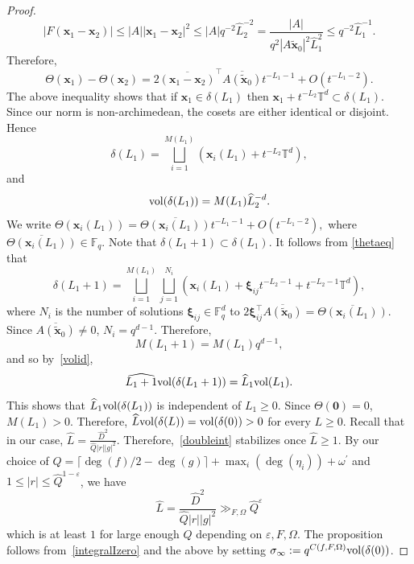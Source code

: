 \documentclass[10pt]{amsart}
\theoremstyle{plain}
\theoremstyle{plain}
\renewcommand{\vec}[1]{\mathbf{#1}}
\theoremstyle{remark}
\theoremstyle{definition}
\renewcommand{\hat}{\widehat}
\newcommand{\hQ}{\widehat{Q}}
\newcommand{\TT}{\mathbb{T}}
\newcommand{\vol}{\textup{vol}}
\begin{document}
\begin{proof}
\[
|F(\vec{x}_1-\vec{x}_2)| \leq |A| |\vec{x}_1-\vec{x}_2|^2 \leq |A| q^{-2}\hat{L}_2^{-2} = \frac{|A|}{q^2 |A\tilde{\vec{x}}_0|^2 \hat{L}_1^2} \leq q^{-2}\hat{L}_1^{-1}.
\]Therefore,
\begin{equation}\label{thetaeq}
\Theta(\vec{x}_1)-\Theta(\vec{x}_2)= 2 \overline{(\vec{x}_1-\vec{x}_2)}^{\intercal}\overline{A(\tilde{\vec{x}}_0)} t^{-L_1-1} +O(t^{-L_1-2}).
\end{equation}
The above inequality shows that if $\vec{x}_1\in \delta(L_1)$ then $\vec{x}_1+t^{-L_2}\TT^d \subset \delta(L_1).$ Since our norm is non-archimedean, the cosets are either identical or disjoint. Hence 
  \[\delta({L_1})=\bigsqcup_{i=1}^{M(L_1)} (\vec{x}_i(L_1)+t^{-L_2}\TT^d), \]
and 
\begin{equation}\label{volid}
\vol (\delta(L_1))= M(L_1)\hat{L}_2^{-d}.
\end{equation}
We write $\Theta(\vec{x}_i(L_1))=\overline{\Theta(\vec{x}_i(L_1))}t^{-L_1-1}+O(t^{-L_1-2}),$ where $\overline{\Theta(\vec{x}_i(L_1))} \in \mathbb{F}_q.$ Note that $\delta(L_1+1)\subset \delta(L_1).$
It follows from \eqref{thetaeq} that
\[
\delta(L_1+1)=\bigsqcup_{i=1}^{M(L_1)} \bigsqcup_{j=1}^{N_i}  (\vec{x}_i(L_1) +\boldsymbol{\xi}_{ij}t^{-L_2-1}+t^{-L_2-1}\TT^d), 
\]
where $N_i$ is the number of solutions $\boldsymbol{\xi}_{ij}\in \mathbb{F}_q^d$  to $2\boldsymbol{\xi}_{ij}^{\intercal}\overline{A(\tilde{\vec{x}}_0)}=\overline{\Theta(\vec{x}_i(L_1))}.$ Since $\overline{A(\tilde{\vec{x}}_0)}\neq 0$, $N_i=q^{d-1}.$
Therefore,
\[
M(L_1+1)=M(L_1)q^{d-1},
\]
and so by~\eqref{volid},
\[
\hat{L_1+1}\vol(\delta({L_1+1}))=\hat{L}_1\vol(L_1).
\]
This shows that $\hat{L}_1\vol(\delta(L_1))$ is independent of $L_1\geq 0$. Since $\Theta(\vec{0})=0$, $M(L_1)>0$. Therefore, $\hat{L}\vol(\delta(L))=\vol(\delta(0))>0$ for every $L\geq 0$. Recall that in our case, $\hat{L}=\frac{\hat{D}^2}{\hQ|r||g|^2}$. Therefore,~\eqref{doubleint} stabilizes once $\hat{L}\geq 1$. By our choice of $Q=\lceil{\deg(f)/2}-\deg(g)\rceil +\max_{i}(\deg(\eta_i))+\omega^{\prime}$ and $1\leq |r|\leq\hQ^{1-\varepsilon}$, we have
\[\hat{L}=\frac{\hat{D}^2}{\hQ|r||g|^2}\gg_{F,\Omega}\hQ^{\varepsilon}\]
which is at least $1$ for large enough $Q$ depending on $\varepsilon,F,\Omega$.
The proposition follows from~\eqref{integralIzero} and the above by setting $\sigma_{\infty}:=q^{C(f,F,\Omega)}\vol(\delta(0))$.
\end{proof}
\end{document}
